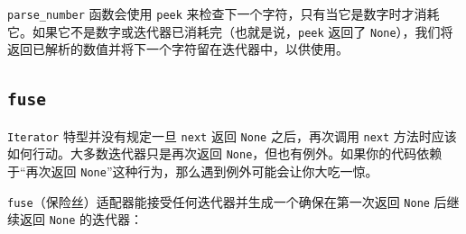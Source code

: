 \texttt{parse\_number} 函数会使用 \texttt{peek} 来检查下一个字符，只有当它是数字时才消耗它。如果它不是数字或迭代器已消耗完（也就是说，\texttt{peek} 返回了 \texttt{None}），我们将返回已解析的数值并将下一个字符留在迭代器中，以供使用。

\subsection{\texttt{fuse}}

\texttt{Iterator} 特型并没有规定一旦 \texttt{next} 返回 \texttt{None} 之后，再次调用 \texttt{next} 方法时应该如何行动。大多数迭代器只是再次返回 \texttt{None}，但也有例外。如果你的代码依赖于“再次返回 \texttt{None}”这种行为，那么遇到例外可能会让你大吃一惊。

\texttt{fuse}（保险丝）适配器能接受任何迭代器并生成一个确保在第一次返回 \texttt{None} 后继续返回 \texttt{None} 的迭代器：

